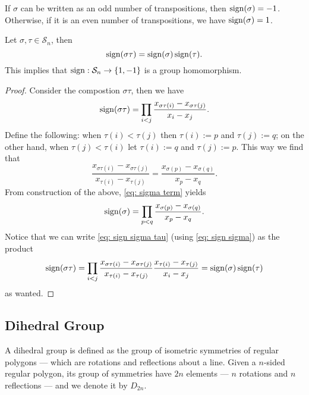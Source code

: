 \begin{corollary}
  If \(\sigma\) can be written as an odd number of transpositions, then
  \(\operatorname{sign}(\sigma) = -1\). Otherwise, if it is an even number of
  transpositions, we have \(\operatorname{sign}(\sigma) = 1\).
\end{corollary}

\begin{proposition}\label{prop: sign is a group homomorphism}
  Let \(\sigma, \tau \in \mathcal S_n\), then
  \[
    \operatorname{sign}(\sigma \tau) = \operatorname{sign}(\sigma)
    \operatorname{sign}(\tau).
  \]
  This implies that \(\operatorname{sign}: \mathcal S_n \to \{1, -1\}\) is a
  group homomorphism.
\end{proposition}

\begin{proof}
  Consider the compostion \(\sigma \tau\), then we have
  \begin{equation}\label{eq: sign sigma tau}
     \operatorname{sign}(\sigma \tau) = \prod_{i < j} \frac{x_{\sigma\tau(i)} -
     x_{\sigma\tau(j)}}{x_i - x_j}.
  \end{equation}
  Define the following: when \(\tau(i) < \tau(j)\) then \(\tau(i) := p\) and
  \(\tau(j) := q\); on the other hand, when \(\tau(j) < \tau(i)\) let \(\tau(i)
  := q\) and \(\tau(j) := p\). This way we find that
  \begin{equation}\label{eq: sigma term}
    \frac{x_{\sigma\tau(i)} - x_{\sigma\tau(j)}}{x_{\tau(i)} - x_{\tau(j)}}
    = \frac{x_{\sigma(p)} - x_{\sigma(q)}}{x_p - x_q}.
  \end{equation}
  From construction of the above, \cref{eq: sigma term} yields
  \begin{equation}\label{eq: sign sigma}
    \operatorname{sign}(\sigma) = \prod_{p < q} \frac{x_{\sigma(p)} -
    x_{\sigma(q)}}{x_p - x_q}.
  \end{equation}
  Notice that we can write \cref{eq: sign sigma tau} (using \cref{eq: sign
  sigma}) as the product
  \[
    \operatorname{sign}(\sigma \tau) = \prod_{i < j}
    \frac{x_{\sigma \tau(i)} - x_{\sigma \tau(j)}}{x_{\tau(i)} - x_{\tau(j)}}
    \frac{x_{\tau(i)} - x_{\tau(j)}}{x_i - x_j}
    = \operatorname{sign}(\sigma) \operatorname{sign}(\tau)
  \]
  as wanted.
\end{proof}

\subsection{Dihedral Group}

\begin{definition}\label{def: dihedral}
  A dihedral group is defined as the group of isometric symmetries of regular
  polygons --- which are rotations and reflections about a line. Given a
  \(n\)-sided regular polygon, its group of symmetries have \(2n\) elements ---
  \(n\) rotations and \(n\) reflections --- and we denote it by \(D_{2n}\).
\end{definition}

